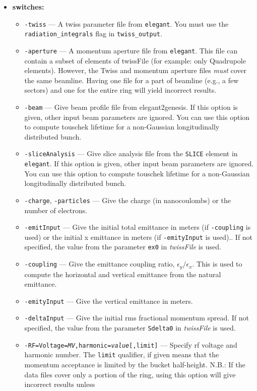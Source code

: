 \documentclass[11pt]{article}
\begin{document}
\begin{itemize}
\item {\bf switches:}
\begin{itemize}
\item {\tt -twiss} --- A twiss parameter file from {\tt elegant}. 
You must use the \verb|radiation_integrals| flag in \verb|twiss_output|.
\item {\tt -aperture} --- A momentum aperture file from {\tt elegant}.
This file can contain a subset of elements of twissFile (for example:
only Quadrupole elements).  However, the Twiss and momentum aperture
files {\em must} cover the same beamline. Having one file for a part
of beamline (e.g., a few sectors) and one for the entire ring will
yield incorrect results.
\item {\tt -beam} --- Give beam profile file from elegant2genesis. If
  this option is given, other input beam parameters are ignored. You
  can use this option to compute touschek lifetime for a non-Gaussian
  longitudinally distributed bunch.
\item {\tt -sliceAnalysis} --- Give slice analysis file from the \verb|SLICE| element in \verb|elegant|.
 If this option is given, other input beam parameters are ignored. You
 can use this option to compute touschek lifetime for a non-Gaussian
 longitudinally distributed bunch.
\item {\tt -charge}, {\tt -particles} --- Give the charge (in nanocoulombs) or the
 number of electrons.
\item {\tt -emitInput} --- Give the initial total emittance in meters (if {\tt -coupling} is used) or
  the initial x emittance in meters (if {\tt -emityInput} is used)..  If not specified,
the value from the parameter \verb|ex0| in {\em twissFile} is used.
\item {\tt -coupling} --- Give the emittance coupling ratio, $\epsilon_y/\epsilon_x$.  This is
 used to compute the horizontal and vertical emittance from the natural emittance.
\item {\tt -emityInput} --- Give the vertical emittance in meters.
\item {\tt -deltaInput} --- Give the initial rms fractional momentum spread.  If not
specified, the value from the parameter \verb|Sdelta0| in {\em twissFile} is used.
\item {\tt -RF=Voltage={\em MV},harmonic={\em value}[,limit]} --- Specify rf voltage and harmonic number.
 The {\tt limit} qualifier, if given means that the momentum acceptance is limited by the bucket
 half-height.
 N.B.: If the data files cover only a portion of the ring, using this option will give incorrect results unless

\end{itemize}
\end{itemize}
\end{document}
